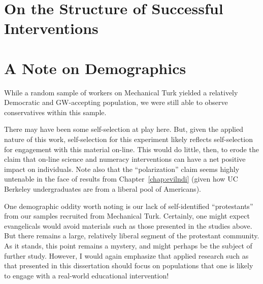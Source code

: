 \section{On the Structure of Successful Interventions}


% 
 
\section{A Note on Demographics}

While a random sample of workers on Mechanical Turk yielded a relatively
Democratic and GW-accepting population, we were still able to observe
conservatives within this sample.

There may have been some self-selection at play here. But, given the applied
nature of this work, self-selection for this experiment likely reflects
self-selection for engagement with this material on-line. This would do little,
then, to erode the claim that on-line science and numeracy interventions can
have a net positive impact on individuals. Note also that the “polarization”
claim seems highly untenable in the face of results from
Chapter~\ref{chap:evilndi} (given how UC Berkeley undergraduates are from a
liberal pool of Americans).

One demographic oddity worth noting is our lack of self-identified “protestants”
from our samples recruited from Mechanical Turk. Certainly, one might expect
evangelicals would avoid materials such as those presented in the studies above.
But there remains a large, relatively liberal segment of the protestant
community. As it stands, this point remains a mystery, and might perhaps be the
subject of further study. However, I would again emphasize that applied research
such as that presented in this dissertation should focus on populations that one
is likely to engage with a real-world educational intervention!

